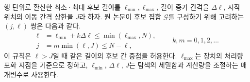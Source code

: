 행 단위로 환산한 최소·최대 후보 길이를 $\ell_{\min},\ell_{\max}$, 길이 증가 간격을 $\Delta\ell$, 시작 위치의 이동 간격 상한을 $J$라 하자. 원 논문이 후보 집합 $\mathcal G$를 구성하기 위해 고려하는 $(j,\ell)$ 쌍은 다음과 같다.
\[
\begin{aligned}
\ell&=\ell_{\min}+k\Delta\ell\le\min(\ell_{\max},N),\\
j&=m\min(\ell,J)\le N-\ell,
\end{aligned}
\qquad k,m=0,1,2,\ldots
\]
이 규칙은 $\ell>J$일 때 같은 길이의 후보 간 중첩을 허용한다. $\ell_{\max}$는 장치의 처리량 포화 지점을 기준으로 정하고, $\ell_{\min}$, $\Delta\ell$, $J$는 탐색의 세밀함과 계산량을 조절하는 매개변수로 사용한다.
